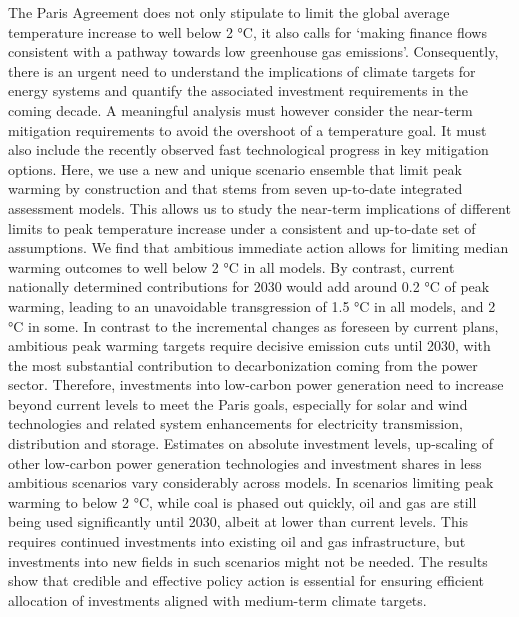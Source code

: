 The Paris Agreement does not only stipulate to limit the global average temperature increase to well below 2 °C, it also calls for ‘making finance flows consistent with a pathway towards low greenhouse gas emissions’. Consequently, there is an urgent need to understand the implications of climate targets for energy systems and quantify the associated investment requirements in the coming decade. A meaningful analysis must however consider the near-term mitigation requirements to avoid the overshoot of a temperature goal. It must also include the recently observed fast technological progress in key mitigation options. Here, we use a new and unique scenario ensemble that limit peak warming by construction and that stems from seven up-to-date integrated assessment models. This allows us to study the near-term implications of different limits to peak temperature increase under a consistent and up-to-date set of assumptions. We find that ambitious immediate action allows for limiting median warming outcomes to well below 2 °C in all models. By contrast, current nationally determined contributions for 2030 would add around 0.2 °C of peak warming, leading to an unavoidable transgression of 1.5 °C in all models, and 2 °C in some. In contrast to the incremental changes as foreseen by current plans, ambitious peak warming targets require decisive emission cuts until 2030, with the most substantial contribution to decarbonization coming from the power sector. Therefore, investments into low-carbon power generation need to increase beyond current levels to meet the Paris goals, especially for solar and wind technologies and related system enhancements for electricity transmission, distribution and storage. Estimates on absolute investment levels, up-scaling of other low-carbon power generation technologies and investment shares in less ambitious scenarios vary considerably across models. In scenarios limiting peak warming to below 2 °C, while coal is phased out quickly, oil and gas are still being used significantly until 2030, albeit at lower than current levels. This requires continued investments into existing oil and gas infrastructure, but investments into new fields in such scenarios might not be needed. The results show that credible and effective policy action is essential for ensuring efficient allocation of investments aligned with medium-term climate targets.
